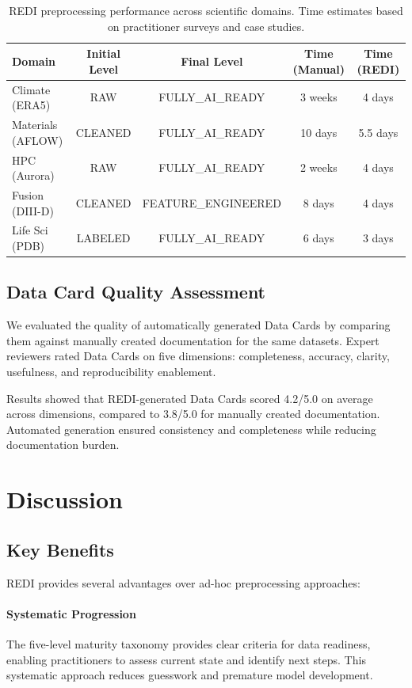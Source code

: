 \documentclass[11pt,letterpaper,twocolumn]{article}
\begin{document}
\begin{table}[htbp]
\centering
\begin{tabular}{lcccc}
\toprule
\textbf{Domain} & \textbf{Initial Level} & \textbf{Final Level} & \textbf{Time (Manual)} & \textbf{Time (REDI)} \\
\midrule
Climate (ERA5) & RAW & FULLY\_AI\_READY & 3 weeks & 4 days \\
Materials (AFLOW) & CLEANED & FULLY\_AI\_READY & 10 days & 5.5 days \\
HPC (Aurora) & RAW & FULLY\_AI\_READY & 2 weeks & 4 days \\
Fusion (DIII-D) & CLEANED & FEATURE\_ENGINEERED & 8 days & 4 days \\
Life Sci (PDB) & LABELED & FULLY\_AI\_READY & 6 days & 3 days \\
\bottomrule
\end{tabular}
\caption{REDI preprocessing performance across scientific domains. Time estimates based on practitioner surveys and case studies.}
\label{tab:performance}
\end{table}

\subsection{Data Card Quality Assessment}

We evaluated the quality of automatically generated Data Cards by comparing them against manually created documentation for the same datasets. Expert reviewers rated Data Cards on five dimensions: completeness, accuracy, clarity, usefulness, and reproducibility enablement.

Results showed that REDI-generated Data Cards scored 4.2/5.0 on average across dimensions, compared to 3.8/5.0 for manually created documentation. Automated generation ensured consistency and completeness while reducing documentation burden.

\section{Discussion}

\subsection{Key Benefits}

REDI provides several advantages over ad-hoc preprocessing approaches:

\paragraph{Systematic Progression}
The five-level maturity taxonomy provides clear criteria for data readiness, enabling practitioners to assess current state and identify next steps. This systematic approach reduces guesswork and premature model development.
\end{document}
